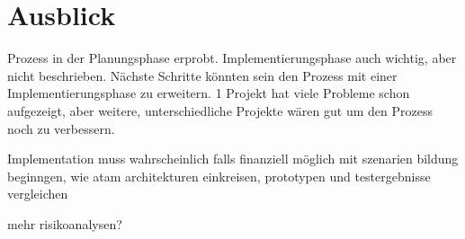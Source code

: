\section{Ausblick}
Prozess in der Planungsphase erprobt. Implementierungsphase auch wichtig, aber nicht beschrieben. Nächste Schritte könnten sein den Prozess mit einer Implementierungsphase zu erweitern. 1 Projekt hat viele Probleme schon aufgezeigt, aber weitere, unterschiedliche Projekte wären gut um den Prozess noch zu verbessern.

Implementation muss wahrscheinlich falls finanziell möglich mit szenarien bildung beginngen, wie atam architekturen einkreisen, prototypen und testergebnisse vergleichen

mehr risikoanalysen?